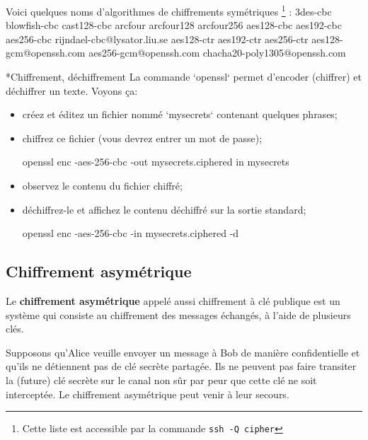 \documentclass[a4paper,11pt]{article}
\begin{document}
Voici quelques noms d'algorithmes de chiffrements symétriques%
\footnote{Cette liste est accessible par la commande \texttt{ssh\ -Q\ cipher}}
: 3des-cbc blowfish-cbc cast128-cbc arcfour arcfour128 arcfour256 aes128-cbc
aes192-cbc aes256-cbc rijndael-cbc@lysator.liu.se aes128-ctr aes192-ctr
aes256-ctr aes128-gcm@openssh.com aes256-gcm@openssh.com
chacha20-poly1305@openssh.com

\bigskip
\begin{Exercice}*{Chiffrement, déchiffrement}    
    La commande `openssl` permet d'encoder (chiffrer) et déchiffrer un texte.
    Voyons ça:
	
	\begin{itemize}
    	\item créez et éditez un fichier nommé `mysecrets` contenant quelques 
    		phrases;
    
    	\item chiffrez ce fichier (vous devrez entrer un mot de passe);

			\begin{term}
			openssl enc -aes-256-cbc -out mysecrets.ciphered
			    in mysecrets
			\end{term}

		\item observez le contenu du fichier chiffré;

			\pagebreak
		\item déchiffrez-le et affichez le contenu déchiffré sur la sortie 
			standard;
			
			\begin{term}
			openssl enc -aes-256-cbc -in mysecrets.ciphered -d
	        \end{term}
	
	\end{itemize}

\end{Exercice}




\subsection{Chiffrement asymétrique}
\label{chiffrement-asymétrique}

Le \textbf{chiffrement asymétrique} appelé aussi chiffrement à clé publique est
un système qui consiste au chiffrement des messages échangés, à l'aide de
plusieurs clés. 

Supposons qu'Alice veuille envoyer un message à Bob de manière confidentielle et
qu'ils ne détiennent pas de clé secrète partagée. Ils ne peuvent pas faire
transiter la (future) clé secrète sur le canal non sûr par peur que cette clé ne
soit interceptée. Le chiffrement asymétrique peut venir à leur secours. 
\end{document}

